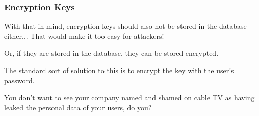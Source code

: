\begin{frame}
\frametitle{Encryption Keys}
With that in mind, encryption keys should also not be stored in the database either... That would make it too easy for attackers! 

Or, if they are stored in the database, they can be stored encrypted. 

The standard sort of solution to this is to encrypt the key with the user's password. 

You don't want to see your company named and shamed on cable TV as having leaked the personal data of your users, do you?


\end{frame}



